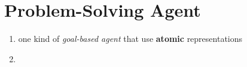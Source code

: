 \section{Problem-Solving Agent}\label{AI: Agent Programs/Problem-Solving Agent}


\begin{enumerate}[itemsep=0.2cm]
    \item one kind of \textit{goal-based agent} that use \textbf{atomic} representations
    \hfill \cite{ai/book/Artificial-Intelligence-A-Modern-Approach/Russell-Norvig}

    \item 
    \hfill \cite{ai/book/Artificial-Intelligence-A-Modern-Approach/Russell-Norvig}
\end{enumerate}





















